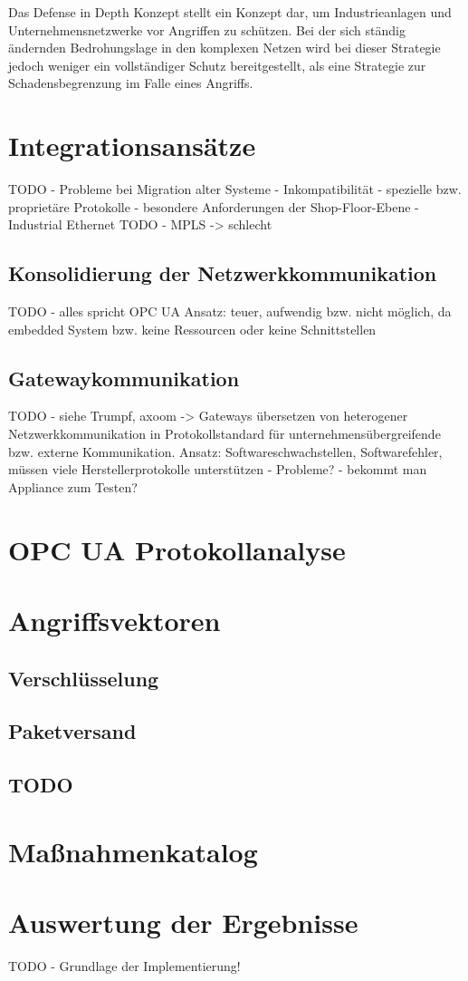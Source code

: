 \clearpage

Das Defense in Depth Konzept stellt ein Konzept dar, um Industrieanlagen und Unternehmensnetzwerke vor Angriffen zu schützen. Bei der sich ständig ändernden Bedrohungslage in den komplexen Netzen wird bei dieser Strategie jedoch weniger ein vollständiger Schutz bereitgestellt, als eine Strategie zur Schadensbegrenzung im Falle eines Angriffs.

\section{Integrationsansätze}
TODO - Probleme bei Migration alter Systeme - Inkompatibilität - spezielle bzw. proprietäre Protokolle - besondere Anforderungen der Shop-Floor-Ebene - Industrial Ethernet
TODO - MPLS -> schlecht

\subsection{Konsolidierung der Netzwerkkommunikation}
TODO - alles spricht OPC UA
Ansatz: teuer, aufwendig bzw. nicht möglich, da embedded System bzw. keine Ressourcen oder keine Schnittstellen

\subsection{Gatewaykommunikation}
TODO - siehe Trumpf, axoom -> Gateways übersetzen von heterogener Netzwerkkommunikation in Protokollstandard für unternehmensübergreifende bzw. externe Kommunikation.
Ansatz: Softwareschwachstellen, Softwarefehler, müssen viele Herstellerprotokolle unterstützen - Probleme? - bekommt man Appliance zum Testen?

\section{\ac{OPC UA} Protokollanalyse}

\section{Angriffsvektoren}
\subsection{Verschlüsselung}
\subsection{Paketversand}
\subsection{TODO}

\section{Maßnahmenkatalog}

\section{Auswertung der Ergebnisse}
TODO - Grundlage der Implementierung!